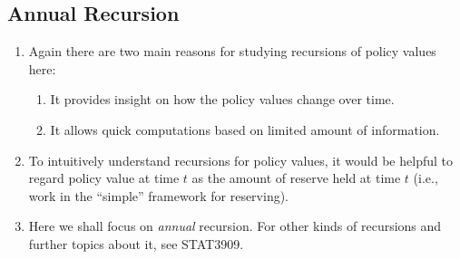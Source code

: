 \subsection{Annual Recursion}
\label{subsect:pv-annual-recursion}
\begin{enumerate}
\item Again there are two main reasons for studying recursions of policy values here:
\begin{enumerate}
\item It provides insight on how the policy values change over time.
\item It allows quick computations based on limited amount of information.
\end{enumerate}

\item To intuitively understand recursions for policy values, it would be
helpful to regard policy value at time \(t\) as the amount of reserve
 held at time \(t\) (i.e., work in the ``simple'' framework for
reserving).

\item Here we shall focus on \emph{annual} recursion. For other kinds of
recursions and further topics about it, see STAT3909.


\end{enumerate}
